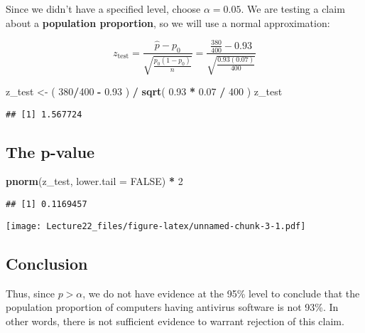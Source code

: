 \documentclass[]{article}
\newenvironment{Shaded}{\begin{snugshade}}{\end{snugshade}}
\newcommand{\DataTypeTok}[1]{\textcolor[rgb]{0.13,0.29,0.53}{#1}}
\newcommand{\DecValTok}[1]{\textcolor[rgb]{0.00,0.00,0.81}{#1}}
\newcommand{\FloatTok}[1]{\textcolor[rgb]{0.00,0.00,0.81}{#1}}
\newcommand{\KeywordTok}[1]{\textcolor[rgb]{0.13,0.29,0.53}{\textbf{#1}}}
\newcommand{\NormalTok}[1]{#1}
\newcommand{\OperatorTok}[1]{\textcolor[rgb]{0.81,0.36,0.00}{\textbf{#1}}}
\newcommand{\OtherTok}[1]{\textcolor[rgb]{0.56,0.35,0.01}{#1}}
\newcommand{\StringTok}[1]{\textcolor[rgb]{0.31,0.60,0.02}{#1}}
\begin{document}
Since we didn't have a specified level, choose \(\alpha = 0.05\). We are
testing a claim about a \textbf{population proportion}, so we will use a
normal approximation:

\[
z_\text{test} = \frac{\hat{p} - p_0}{\sqrt{\frac{p_0(1-p_0)}{n}}} = \frac{ \frac{380}{400} - 0.93}{\sqrt{\frac{0.93(0.07)}{400}}}
\]

\begin{Shaded}
\begin{Highlighting}[]
\NormalTok{z_test <-}\StringTok{ }\NormalTok{( }\DecValTok{380}\OperatorTok{/}\DecValTok{400} \OperatorTok{-}\StringTok{ }\FloatTok{0.93}\NormalTok{ ) }\OperatorTok{/}\StringTok{ }\KeywordTok{sqrt}\NormalTok{( }\FloatTok{0.93} \OperatorTok{*}\StringTok{ }\FloatTok{0.07} \OperatorTok{/}\StringTok{ }\DecValTok{400}\NormalTok{ )}
\NormalTok{z_test}
\end{Highlighting}
\end{Shaded}

\begin{verbatim}
## [1] 1.567724
\end{verbatim}

\hypertarget{the-p-value}{%
\subsection{The p-value}\label{the-p-value}}

\begin{Shaded}
\begin{Highlighting}[]
\KeywordTok{pnorm}\NormalTok{(z_test, }\DataTypeTok{lower.tail =} \OtherTok{FALSE}\NormalTok{) }\OperatorTok{*}\StringTok{ }\DecValTok{2}
\end{Highlighting}
\end{Shaded}

\begin{verbatim}
## [1] 0.1169457
\end{verbatim}

\texttt{[image: Lecture22\_files/figure-latex/unnamed-chunk-3-1.pdf]}

\hypertarget{conclusion}{%
\subsection{Conclusion}\label{conclusion}}

Thus, since \(p > \alpha\), we do not have evidence at the 95\% level to
conclude that the population proportion of computers having antivirus
software is not 93\%. In other words, there is not sufficient evidence
to warrant rejection of this claim.
\end{document}
